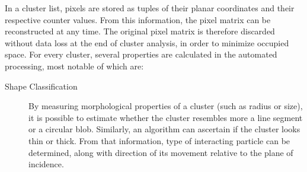 In a cluster list, pixels are stored as tuples of their planar coordinates and their respective counter values. From this information, the pixel matrix can be reconstructed at any time. The original pixel matrix is therefore discarded without data loss at the end of cluster analysis, in order to minimize occupied space. For every cluster, several properties are calculated in the automated processing, most notable of which are:

\label{db:cluster-properties}
\begin{description}
	\item[Shape Classification]
	\label{db:shape-classification}
	By measuring morphological properties of a cluster (such as radius or size), it is possible to estimate whether the cluster resembles more a line segment or a circular blob. Similarly, an algorithm can ascertain if the cluster looks thin or thick. From that information, type of interacting particle can be determined, along with direction of its movement relative to the plane of incidence. 

	\todo


    \begin{figure}[t]
    \begin{center}

\end{center}
\end{figure}
\end{description}
